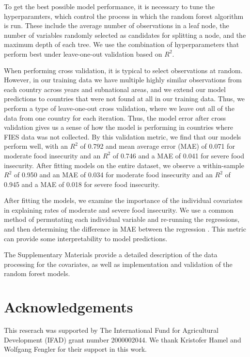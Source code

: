 \documentclass{article}
\begin{document}
To get the best possible model performance, it is necessary to tune the hyperparamters, which control the process in which the random forest algorithm is run.  These include the average number of observations in a leaf node, the number of variables randomly selected as candidates for splitting a node, and the maximum depth of each tree.  We use the combination of hyperparameters that perform best under leave-one-out validation based on $R^2$.

When performing cross validation, it is typical to select observations at random.  However, in our training data we have multiple highly similar observations from each country across years and subnational areas, and we extend our model predictions to countries that were not found at all in our training data.  Thus, we perform a type of leave-one-out cross validation, where we leave out all of the data from one country for each iteration.  Thus, the model error after cross validation gives us a sense of how the model is performing in countries where FIES data was not collected.  By this validation metric, we find that our models perform well, with an $R^2$ of 0.792 and mean average error (MAE) of 0.071 for moderate food insecurity and an $R^2$ of 0.746 and a MAE of 0.041 for severe food insecurity.  After fitting models on the entire dataset, we observe a within-sample $R^2$ of 0.950 and an MAE of 0.034 for moderate food insecurity and an $R^2$ of 0.945 and a MAE of 0.018 for severe food insecurity.

After fitting the models, we examine the importance of the individual covariates in explaining rates of moderate and severe food insecurity. We use a common method of permutating each individual variable and re-running the regressions, and then determining the difference in MAE between the regression \citep{ishwaran2007variable, breiman2001random}.  This metric can provide some interpretability to model predictions.

The Supplementary Materials provide a detailed description of the data processing for the covariates, as well as implementation and validation of the random forest models.

\section{Acknowledgements}
This reserach was supported by The International Fund for Agricultural Development (IFAD) grant number 2000002044.  We thank Kristofer Hamel and Wolfgang Fengler for their support in this work.
\end{document}
